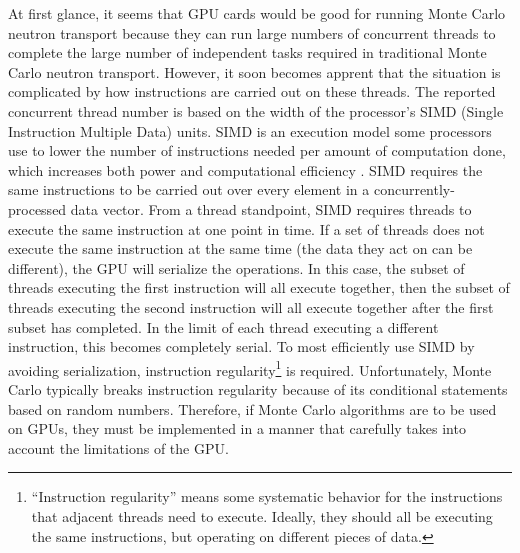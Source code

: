 \documentclass[preprint,12pt]{elsarticle}
\begin{document}
At first glance, it seems that GPU cards would be good for running Monte Carlo neutron transport because they can run large numbers of concurrent threads to complete the large number of independent tasks required in traditional Monte Carlo neutron transport.  However, it soon becomes apprent that the situation is complicated by how instructions are carried out on these threads.  The reported concurrent thread number is based on the width of the processor's SIMD (Single Instruction Multiple Data) units.  SIMD is an execution model some processors use to lower the number of instructions needed per amount of computation done, which increases both power and computational efficiency \cite{simd_power}.  SIMD requires the same instructions to be carried out over every element in a concurrently-processed data vector.  From a thread standpoint, SIMD requires threads to execute the same instruction at one point in time.  If a set of threads does not execute the same instruction at the same time (the data they act on can be different), the GPU will serialize the operations.  In this case, the subset of threads executing the first instruction will all execute together, then the subset of threads executing the second instruction will all execute together after the first subset has completed. In the limit of each thread executing a different instruction, this becomes completely serial.  To most efficiently use SIMD by avoiding serialization, instruction regularity\footnote{``Instruction regularity'' means some systematic behavior for the instructions that adjacent threads need to execute.  Ideally, they should all be executing the same instructions, but operating on different pieces of data.} is required. Unfortunately, Monte Carlo typically breaks instruction regularity because of its conditional statements based on random numbers.  Therefore, if Monte Carlo algorithms are to be used on GPUs, they must be implemented in a manner that carefully takes into account the limitations of the GPU.
\end{document}
